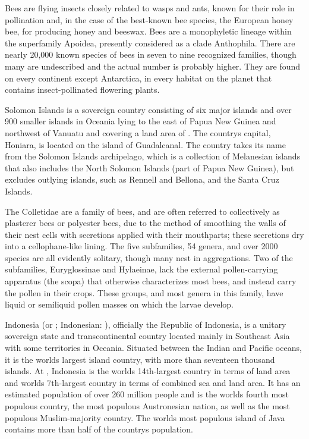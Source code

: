 \documentclass{article} \usepackage{iclr2019_conference,times}
\begin{document}
Bees are flying insects closely related to wasps and ants, known for their role in pollination and, in the case of the best-known bee species, the European honey bee, for producing honey and beeswax. Bees are a monophyletic lineage within the superfamily Apoidea, presently considered as a clade Anthophila. There are nearly 20,000 known species of bees in seven to nine recognized families, though many are undescribed and the actual number is probably higher. They are found on every continent except Antarctica, in every habitat on the planet that contains insect-pollinated flowering plants.

Solomon Islands is a sovereign country consisting of six major islands and over 900 smaller islands in Oceania lying to the east of Papua New Guinea and northwest of Vanuatu and covering a land area of . The countrys capital, Honiara, is located on the island of Guadalcanal. The country takes its name from the Solomon Islands archipelago, which is a collection of Melanesian islands that also includes the North Solomon Islands (part of Papua New Guinea), but excludes outlying islands, such as Rennell and Bellona, and the Santa Cruz Islands.

The Colletidae are a family of bees, and are often referred to collectively as plasterer bees or polyester bees, due to the method of smoothing the walls of their nest cells with secretions applied with their mouthparts; these secretions dry into a cellophane-like lining. The five subfamilies, 54 genera, and over 2000 species are all evidently solitary, though many nest in aggregations. Two of the subfamilies, Euryglossinae and Hylaeinae, lack the external pollen-carrying apparatus (the scopa) that otherwise characterizes most bees, and instead carry the pollen in their crops. These groups, and most genera in this family, have liquid or semiliquid pollen masses on which the larvae develop.

Indonesia (or ; Indonesian: ), officially the Republic of Indonesia, is a unitary sovereign state and transcontinental country located mainly in Southeast Asia with some territories in Oceania. Situated between the Indian and Pacific oceans, it is the worlds largest island country, with more than seventeen thousand islands. At , Indonesia is the worlds 14th-largest country in terms of land area and worlds 7th-largest country in terms of combined sea and land area. It has an estimated population of over 260 million people and is the worlds fourth most populous country, the most populous Austronesian nation, as well as the most populous Muslim-majority country. The worlds most populous island of Java contains more than half of the countrys population.
\end{document}
